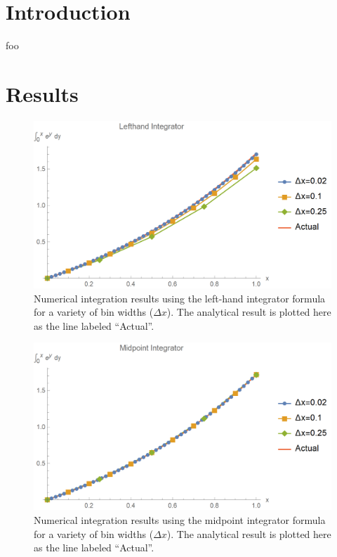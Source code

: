 \documentclass{article}
\author{\hwauthor}
\title{\hwtitle}
\date{\hwdate}
\begin{document}
\maketitle
\thispagestyle{fancy}

\section{Introduction}

foo

\section{Results}

\bigskip
{}
\medskip

\begin{figure}[h]
    \centering
    \includegraphics[width=5in]{homework2/P1_LH.png}
    \caption{Numerical integration results using the left-hand integrator formula for a variety of bin widths ($\Delta x$). The analytical result is plotted here as the line labeled ``Actual''.}
    \label{fig:p1_left}
\end{figure}

\begin{figure}[h]
    \centering
    \includegraphics[width=5in]{homework2/P1_MP.png}
    \caption{Numerical integration results using the midpoint integrator formula for a variety of bin widths ($\Delta x$). The analytical result is plotted here as the line labeled ``Actual''.}
    \label{fig:p1_mid}
\end{figure}
\end{document}
